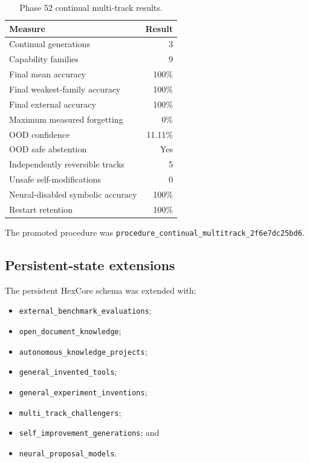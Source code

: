 \begin{table}[htbp]
\centering
\begin{tabular}{lr}
\hline
\textbf{Measure} & \textbf{Result}\\
\hline
Continual generations & 3\\
Capability families & 9\\
Final mean accuracy & 100\%\\
Final weakest-family accuracy & 100\%\\
Final external accuracy & 100\%\\
Maximum measured forgetting & 0\%\\
OOD confidence & 11.11\%\\
OOD safe abstention & Yes\\
Independently reversible tracks & 5\\
Unsafe self-modifications & 0\\
Neural-disabled symbolic accuracy & 100\%\\
Restart retention & 100\%\\
\hline
\end{tabular}
\caption{Phase 52 continual multi-track results.}
\label{tab:phase52-results}
\end{table}

The promoted procedure was
\texttt{procedure\_continual\_multitrack\_2f6e7dc25bd6}.

\subsection{Persistent-state extensions}

The persistent HexCore schema was extended with:
\begin{itemize}
    \item \texttt{external\_benchmark\_evaluations};
    \item \texttt{open\_document\_knowledge};
    \item \texttt{autonomous\_knowledge\_projects};
    \item \texttt{general\_invented\_tools};
    \item \texttt{general\_experiment\_inventions};
    \item \texttt{multi\_track\_challengers};
    \item \texttt{self\_improvement\_generations}; and
    \item \texttt{neural\_proposal\_models}.
\end{itemize}

